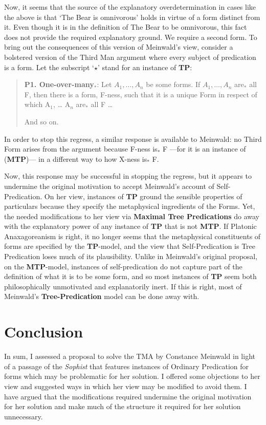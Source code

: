 \documentclass [article] {memoir}
\begin{document}
Now, it seems that the source of the explanatory overdetermination in cases like the above is that `The Bear is omnivorous' holds in virtue of a form distinct from it. Even though it is  in the definition of The Bear to be omnivorous, this fact does not provide the required explanatory ground. We require a second form.  To bring out the consequences of this version of Meinwald's view, consider a bolstered version of the Third Man argument where every subject of predication is a form. Let the subscript `$\star$' stand for an instance of \textbf{TP}:
\begin{quote}
\textbf{P1. One-over-many$_*$}: Let $A_1, \dots  , A_n$ be some forms. If $A_1, \dots , A_n$ are$_*$ all F, then there is a form, F-ness, such that it is a unique Form in respect of which A$_1$, … A$_n$ are$_*$ all F \dots 

And so on. 
\end{quote}
In order to stop this regress, a similar response is available to Meinwald: no Third Form arises from the argument because F-ness is$_*$ F —for it is an instance of (\textbf{MTP})— in a different way to how X-ness is$_*$ F. 

Now, this response may be successful in stopping the regress, but it appears to undermine the original motivation to accept Meinwald's account of Self-Predication. On her view, instances of \textbf{TP} ground the sensible properties of particulars because they specify the metaphysical ingredients of the Forms. Yet, the needed modifications to her view via \textbf{Maximal Tree Predications} do away with the explanatory power of any instance of \textbf{TP} that is not \textbf{MTP}. If Platonic Anaxagoreanism is right, it no longer seems that the metaphysical constituents of forms are specified by the \textbf{TP}-model, and the view that Self-Predication is Tree Predication loses much of its plausibility. Unlike in Meinwald's original proposal, on the \textbf{MTP}-model, instances of self-predication do not capture part of the definition of what it is to be some form, and so most instances of \textbf{TP} seem both philosophically unmotivated and explanatorily inert. If this is right, most of Meinwald's \textbf{Tree-Predication} model can be done away with. 

\chapter{Conclusion}
In sum, I assessed a proposal to solve the TMA by Constance Meinwald in light of a passage of the \textit{Sophist} that features instances of Ordinary Predication for forms which may be problematic for her solution. I offered some objections to her view and suggested ways in which her view may be modified to avoid them. I have argued that the modifications required undermine the original motivation for her solution and make much of the structure it required for her solution unnecessary. 
\end{document}
